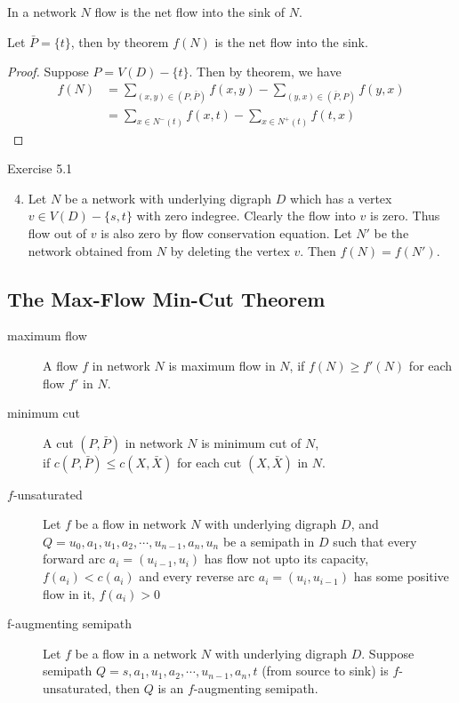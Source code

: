 \begin{corollary}
	In a network $N$ flow is the net flow into the sink of $N$.
\end{corollary}
\begin{synopsis}
	Let $\bar{P} = \{ t \}$, then by theorem $f(N)$ is the net flow into the sink.
\end{synopsis}
\begin{proof}
	Suppose $P = V(D)-\{t\}$.
	Then by theorem, we have
	\begin{align*}
		f(N) 	& = \sum_{(x,y) \in (P,\bar{P})} f(x,y) - \sum_{(y,x) \in (\bar{P},P)} f(y,x) \\
			& = \sum_{x \in N^-(t)} f(x,t) - \sum_{x \in N^+(t)} f(t,x)
	\end{align*}
\end{proof}

\begin{remark}Exercise 5.1
	\begin{enumerate}
		\setcounter{enumi}{3}
		\item Let $N$ be a network with underlying digraph $D$ which has a vertex $v \in V(D) - \{ s,t \}$ with zero indegree.
			Clearly the flow into $v$ is zero.
			Thus flow out of $v$ is also zero by flow conservation equation.
			Let $N'$ be the network obtained from $N$ by deleting the vertex $v$.
			Then $f(N) = f(N')$.
	\end{enumerate}
\end{remark}

\subsection{The Max-Flow Min-Cut Theorem}
\begin{description}
	\item[maximum flow] A flow $f$ in network $N$ is maximum flow in $N$, if $f(N) \ge f'(N)$ for each flow $f'$ in $N$.
	\item[minimum cut] A cut $(P,\bar{P})$ in network $N$ is minimum cut of $N$,\\ if $c(P,\bar{P}) \le c(X,\bar{X})$ for each cut $(X,\bar{X})$ in $N$.
	\item[$f$-unsaturated] Let $f$ be a flow in network $N$ with underlying digraph $D$, and $Q = u_0,a_1,u_1,a_2,\cdots,u_{n-1},a_n,u_n$ be a semipath in $D$ such that every forward arc $a_i = (u_{i-1},u_i)$ has flow not upto its capacity, $f(a_i) < c(a_i)$ and every reverse arc $a_i = (u_i,u_{i-1})$ has some positive flow in it, $f(a_i) > 0$
	\item[f-augmenting semipath] Let $f$ be a flow in a network $N$ with underlying digraph $D$.
		Suppose semipath $Q = s,a_1,u_1,a_2,\cdots,u_{n-1},a_n,t$ (from source to sink) is $f$-unsaturated, then $Q$ is an $f$-augmenting semipath.
\end{description}

